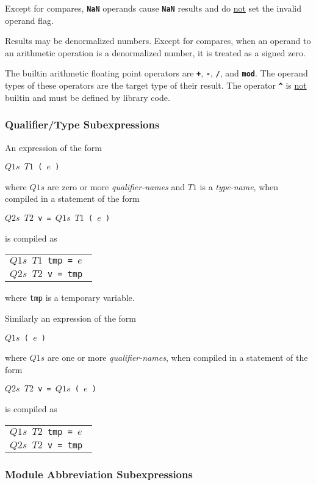 \documentclass[12pt]{article}
\newcommand{\TT}[1]{{\tt \bfseries #1}}
\begin{document}
Except for compares, \TT{NaN} operands cause \TT{NaN} results and
do \underline{not} set the invalid operand flag.

Results may be denormalized numbers.  Except for compares,
when an operand to an arithmetic operation is a denormalized
number, it is treated as a signed zero.

The builtin arithmetic floating point
operators are \TT{+}, \TT{-}, \TT{/}, and \TT{mod}.
The operand types of these operators are the target type of their result.
The operator
\TT{\textasciicircum} is \underline{not} builtin and must be
defined by library code.

\subsubsection{Qualifier/Type Subexpressions}
\label{QUALIFIER/TYPE-SUBEXPRESSIONS}

An expression of the form
\begin{center}
\tt $Q1s$ $T1$ ( $e$ )
\end{center}
where $Q1s$ are zero or more {\em qualifier-names}
and $T1$ is a {\em type-name},
when compiled in a statement of the form 
\begin{center}
\tt $Q2s$ $T2$ v = $Q1s$ $T1$ ( $e$ )
\end{center}
is compiled as
\begin{center}
\begin{tabular}{l}
\tt $Q1s$ $T1$ tmp = $e$ \\
\tt $Q2s$ $T2$ v = tmp
\end{tabular}
\end{center}
where {\tt tmp} is a temporary variable.

Similarly an expression of the form
\begin{center}
\tt $Q1s$ ( $e$ )
\end{center}
where $Q1s$ are one or more {\em qualifier-names},
when compiled in a statement of the form 
\begin{center}
\tt $Q2s$ $T2$ v = $Q1s$ ( $e$ )
\end{center}
is compiled as
\begin{center}
\begin{tabular}{l}
\tt $Q1s$ $T2$ tmp = $e$ \\
\tt $Q2s$ $T2$ v = tmp
\end{tabular}
\end{center}

\subsubsection{Module Abbreviation Subexpressions}
\label{MODULE-ABBREVIATION-SUBEXPRESSIONS}
\end{document}
